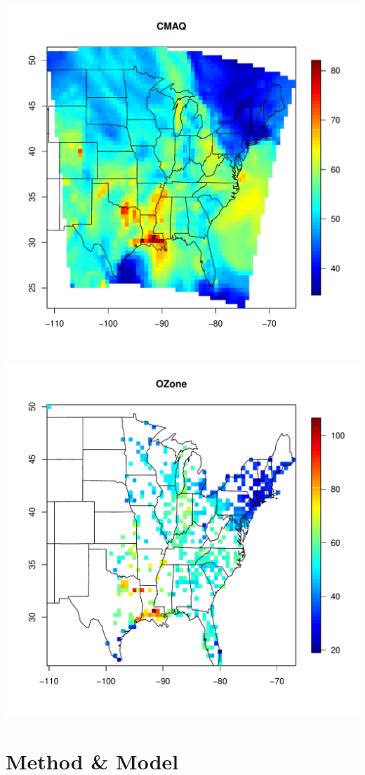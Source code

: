 \documentclass{article}                                                   %
\begin{document}
    \includegraphics{raw/cmaq.pdf}
    \includegraphics{raw/ozone.pdf}

\section{Method \& Model}
\end{document}
